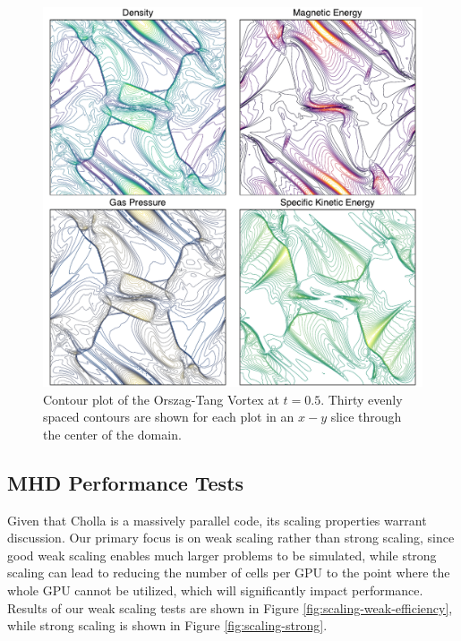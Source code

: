 \documentclass[modern, linenumbers]{aastex631}
\newcommand*{\img}[1]{%
    \raisebox{-.05\baselineskip}{%
        \texttt{[image: \#1]}%
    }%
}
\begin{document}
\begin{figure}[!ht]
    \includegraphics[width=\linewidth]{orszag-tang-vortex.pdf}
    \caption{Contour plot of the Orszag-Tang Vortex at $t=0.5$. Thirty evenly spaced contours are shown for each plot in an $x-y$ slice through the center of the domain.  \href{https://zenodo.org/records/10927223}{\img{zenodo-gradient-200.png}}}
    \label{fig:otv}
\end{figure}

\subsection{MHD Performance Tests}
\label{sec:mhd-perf-tests}

Given that Cholla is a massively parallel code, its scaling properties warrant discussion. Our primary focus is on weak scaling rather than strong scaling, since good weak scaling enables much larger problems to be simulated, while strong scaling can lead to reducing the number of cells per GPU to the point where the whole GPU cannot be utilized, which will significantly impact performance. Results of our weak scaling tests are shown in Figure \ref{fig:scaling-weak-efficiency}, while strong scaling is shown in Figure \ref{fig:scaling-strong}.
\end{document}
